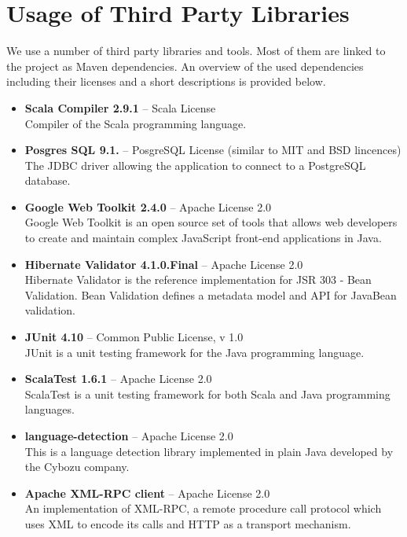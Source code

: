 \section{Usage of Third Party Libraries}

We use a number of third party libraries and tools. Most of them are linked to the project as Maven dependencies. An overview of the used dependencies including their licenses and a short descriptions is provided below.

\begin{itemize}
\item {\bf Scala Compiler 2.9.1} -- Scala License \\
Compiler of the Scala programming language.
\item {\bf Posgres SQL 9.1.} -- PosgreSQL License (similar to MIT and BSD lincences) \\
The JDBC driver allowing the application to connect to a PostgreSQL database.
\item {\bf Google Web Toolkit 2.4.0} -- Apache License 2.0 \\
Google Web Toolkit is an open source set of tools that allows web developers to create and maintain complex JavaScript front-end applications in Java.

\item {\bf Hibernate Validator 4.1.0.Final} -- Apache License 2.0 \\
Hibernate Validator is the reference implementation for JSR 303 - Bean Validation. Bean Validation defines a metadata model and API for JavaBean validation.

\item {\bf JUnit 4.10} -- Common Public License, v 1.0 \\
JUnit is a unit testing framework for the Java programming language.

\item {\bf ScalaTest 1.6.1} -- Apache License 2.0 \\
ScalaTest is a unit testing framework for both Scala and Java programming languages.

\item {\bf language-detection} -- Apache License 2.0 \\
This is a language detection library implemented in plain Java developed by the Cybozu company.

\item {\bf Apache XML-RPC client} -- Apache License 2.0  \\
An implementation of XML-RPC, a remote procedure call protocol which uses XML to encode its calls and HTTP as a transport mechanism.


\end{itemize}
